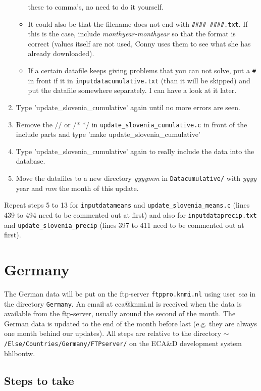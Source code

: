 \documentclass[a4paper]{article}
\begin{document}
\begin{enumerate}
\begin{itemize}
    these to comma's, no need to do it yourself.
  \item It could also be that the filename does not end with
    \texttt{\#\#\#\#-\#\#\#\#.txt}. If this is the case, include
    \textit{monthyear-monthyear} so that the format is correct (values
    itself are not used, Conny uses them to see what she has already
    downloaded).
  \item If a certain datafile keeps giving problems that you can not
    solve, put a \texttt{\#} in front if it in
    \texttt{inputdatacumulative.txt} (than it will be skipped) and put
    the datafile somewhere separately. I can have a look at it later.
  \end{itemize}
\item Type 'update\_slovenia\_cumulative' again until no more errors
  are seen.
\item Remove the // or /* */ in
  \texttt{update\_slovenia\_cumulative.c} in front of the include
  parts and type 'make update\_slovenia\_cumulative'
\item Type 'update\_slovenia\_cumulative' again to really include the
  data into the database.
\item Move the datafiles to a new directory \textit{yyyymm} in
  \texttt{Datacumulative/} with \textit{yyyy} year and \textit{mm} the
  month of this update.
\end{enumerate}

Repeat steps 5 to 13 for \texttt{inputdatameans} and
\texttt{update\_slovenia\_means.c} (lines 439 to 494 need to be
commented out at first) and also for \texttt{inputdataprecip.txt} and
\texttt{update\_slovenia\_precip} (lines 397 to 411 need to be
commented out at first).



\section{Germany}

The German data will be put on the ftp-server \texttt{ftppro.knmi.nl}
using user \textit{eca} in the directory \texttt{Germany}. An email at
eca@knmi.nl is received when the data is available from the
ftp-server, usually around the second of the month. The German data is
updated to the end of the month before last (e.g. they are always one
month behind our updates). All steps are relative to the directory
\texttt{$\sim$/Else/Countries/Germany/FTPserver/} on the ECA\&D
development system bhlbontw.

\subsection*{Steps to take}
\end{document}
